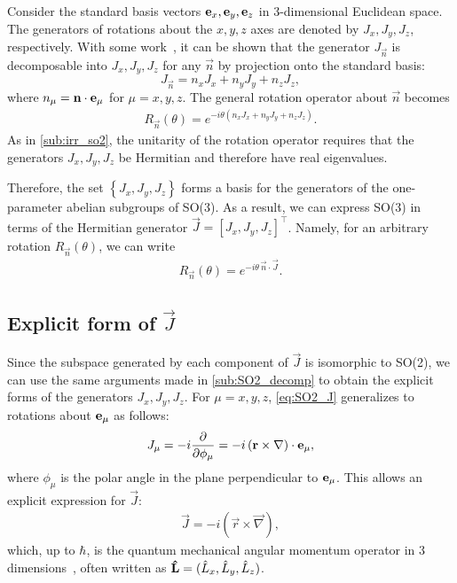 Consider the standard basis vectors $\mathbf{e}_x,\mathbf{e}_y,\mathbf{e}_z$ in 3-dimensional Euclidean space. The generators of rotations about the $x,y,z$ axes are denoted by $J_x,J_y,J_z$, respectively. With some work~\cite{Tung1985}, it can be shown that the generator $J_{\vec{n}}$ is decomposable into $J_x,J_y,J_z$ for any $\vec{n}$ by projection onto the standard basis:
\begin{equation}
    J_{\vec{n}} = n_x J_x + n_y J_y + n_z J_z,
\end{equation}
where $n_\mu = \mathbf{n}\cdot\mathbf{e}_\mu$ for $\mu=x,y,z$.
The general rotation operator about $\vec{n}$ becomes
\begin{align}
    R_{\vec{n}}(\theta) = e^{-i\theta(n_x J_x + n_y J_y + n_z J_z)}.
\end{align}
As in \cref{sub:irr_so2}, the unitarity of the rotation operator requires that the generators $J_x,J_y,J_z$ be Hermitian and therefore have real eigenvalues.

Therefore, the set $\left\{ J_x,J_y,J_z \right\}$ forms a basis for the generators of the one-parameter abelian subgroups of SO(3). As a result, we can express SO(3) in terms of the Hermitian generator $\vec{J} = [J_x,J_y,J_z]^\top$. Namely, for an arbitrary rotation $R_{\vec{n}}(\theta)$, we can write
\begin{align}
    R_{\vec{n}}(\theta) = e^{-i\theta\,\vec{n}\cdot\vec{J}}.
\end{align}

\subsection{Explicit form of $\vec{J}$}\label{sec:SO3_J}
Since the subspace generated by each component of $\vec{J}$ is isomorphic to SO(2), we can use the same arguments made in \cref{sub:SO2_decomp} to obtain the explicit forms of the generators $J_x,J_y,J_z$. For $\mu=x,y,z$, \cref{eq:SO2_J} generalizes to rotations about $\mathbf{e}_\mu$ as follows:
\begin{align}
    J_\mu = -i \frac{\partial}{\partial\phi_\mu} = -i \left( \mathbf{r}\times\mathbf{\nabla} \right)\cdot\mathbf{e}_\mu,
\end{align}
where $\phi_\mu$ is the polar angle in the plane perpendicular to $\mathbf{e}_\mu$. This allows an explicit expression for $\vec{J}$:
\begin{align}
    \vec{J} = -i \left( \vec{r}\times\vec{\nabla} \right),
\end{align}
which, up to $\hbar$, is the quantum mechanical angular momentum operator in 3 dimensions~\cite{Hall2013}, often written as $\mathbf{\hat{L}}=(\hat{L}_x,\hat{L}_y,\hat{L}_z)$.

